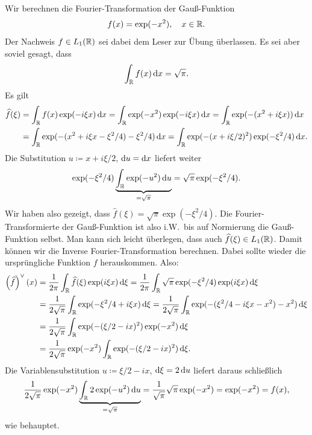 \begin{example}
Wir berechnen die Fourier-Transformation der Gauß-Funktion
\[
  f(x) = \exp(-x^{2}), \quad x \in \mathbb{R}.
\]
Der Nachweis $ f \in L_{1}(\mathbb{R}) $ sei dabei dem Leser zur Übung überlassen. Es sei aber soviel 
gesagt, dass
\[
  \int_{\R} f(x) \dif x = \sqrt{\pi}.
\]
Es gilt
\begin{align*}
   \widehat{f}(\xi)
&= \int_{\R} f(x) \exp(-i\xi x) \dif x
 = \int_{\R} \exp(-x^{2}) \exp(-i\xi x) \dif x
 = \int_{\R} \exp(-(x^{2} + i\xi x)) \dif x \\
&= \int_{\R} \exp(-(x^{2} + i\xi x - \xi^{2} / 4) - \xi^{2}/4 ) \dif x
 = \int_{\R} \exp(-(x + i\xi / 2)^{2}) \exp(-\xi^{2}/4) \dif x.
\end{align*}
Die Substitution $ u \coloneqq x + i\xi / 2 $, $ \dif u = \dif x $ liefert weiter
\[
    \exp(-\xi^{2}/4) \underbrace{ \int_{\R} \exp(-u^{2}) \dif u }_{=\sqrt{\pi}}
  = \sqrt{\pi} \exp(-\xi^{2}/4).
\]
Wir haben also gezeigt, dass $ \widehat{f}(\xi) = \sqrt{\pi} \exp(-\xi^{2}/4) $. Die
Fourier-Transformierte der Gauß-Funktion ist also i.W.\ bis auf Normierung die Gauß-Funktion selbst.
Man kann sich leicht überlegen, dass auch $ \widehat{f}(\xi) \in L_{1}(\mathbb{R}) $. Damit können wir
die Inverse Fourier-Transformation berechnen. Dabei sollte wieder die ursprüngliche Funktion $ f $
herauskommen. Also:
\begin{align*}
   \left( \widehat{f} \right)^{\vee}(x)
&= \frac{1}{2\pi} \int_{\R} \widehat{f}(\xi) \exp(i\xi x) \dif \xi
 = \frac{1}{2\pi} \int_{\R} \sqrt{\pi} \exp(-\xi^{2}/4) \exp(i\xi x) \dif \xi \\
&= \frac{1}{2\sqrt{\pi}} \int_{\R} \exp(-\xi^{2}/4 + i\xi x) \dif \xi
 = \frac{1}{2\sqrt{\pi}} \int_{\R} \exp(- (\xi^{2}/4 - i\xi x - x^{2}) - x^{2}) \dif \xi \\
&= \frac{1}{2\sqrt{\pi}} \int_{\R} \exp(-(\xi/2 - ix)^{2}) \exp(-x^{2}) \dif \xi \\
&= \frac{1}{2\sqrt{\pi}} \exp(-x^{2}) \int_{\R} \exp(-(\xi/2 - ix)^{2}) \dif \xi.
\end{align*}
Die Variablensubstitution $ u \coloneqq \xi / 2 - ix $, $ \dif \xi = 2 \dif u $ liefert 
daraus schließlich
\[
    \frac{1}{2\sqrt{\pi}} \exp(-x^{2}) \underbrace{ \int_{\R} 2\exp(-u^{2}) \dif u }_{=\sqrt{\pi}}
  = \frac{1}{\sqrt{\pi}} \sqrt{\pi} \exp(-x^{2})
  = \exp(-x^{2}) = f(x),
\]
wie behauptet.
\end{example}

